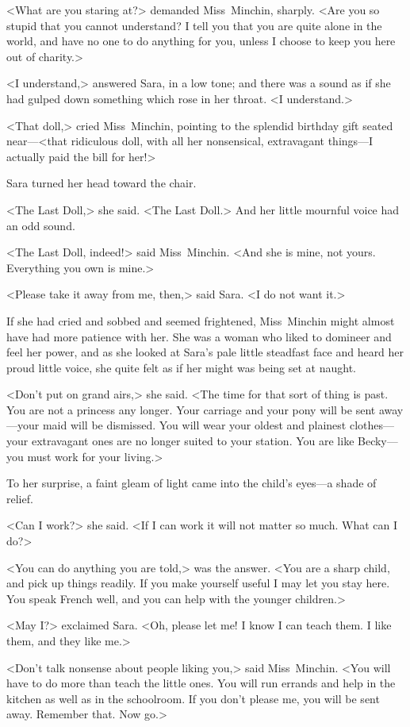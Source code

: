 <What are you staring at?> demanded Miss~Minchin, sharply. <Are you so stupid that you cannot understand? I tell you that you are quite alone in the world, and have no one to do anything for you, unless I choose to keep you here out of charity.>

<I understand,> answered Sara, in a low tone; and there was a sound as if she had gulped down something which rose in her throat. <I understand.>

<That doll,> cried Miss~Minchin, pointing to the splendid birthday gift seated near—<that ridiculous doll, with all her nonsensical, extravagant things—I actually paid the bill for her!>

Sara turned her head toward the chair.

<The Last Doll,> she said. <The Last Doll.> And her little mournful voice had an odd sound.

<The Last Doll, indeed!> said Miss~Minchin. <And she is mine, not yours. Everything you own is mine.>

<Please take it away from me, then,> said Sara. <I do not want it.>

If she had cried and sobbed and seemed frightened, Miss~Minchin might almost have had more patience with her. She was a woman who liked to domineer and feel her power, and as she looked at Sara's pale little steadfast face and heard her proud little voice, she quite felt as if her might was being set at naught.

<Don't put on grand airs,> she said. <The time for that sort of thing is past. You are not a princess any longer. Your carriage and your pony will be sent away—your maid will be dismissed. You will wear your oldest and plainest clothes—your extravagant ones are no longer suited to your station. You are like Becky—you must work for your living.>

To her surprise, a faint gleam of light came into the child's eyes—a shade of relief.

<Can I work?> she said. <If I can work it will not matter so much. What can I do?>

<You can do anything you are told,> was the answer. <You are a sharp child, and pick up things readily. If you make yourself useful I may let you stay here. You speak French well, and you can help with the younger children.>

<May I\@?> exclaimed Sara. <Oh, please let me! I know I can teach them. I like them, and they like me.>

<Don't talk nonsense about people liking you,> said Miss~Minchin. <You will have to do more than teach the little ones. You will run errands and help in the kitchen as well as in the schoolroom. If you don't please me, you will be sent away. Remember that. Now go.>


